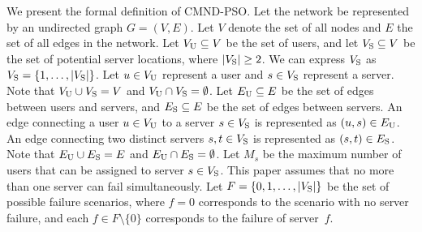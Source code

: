 \documentclass[10pt, letterpaper]{IEEEtran}
\begin{document}
\begin{CJK}{UTF8}{ipxm}
We present the formal definition of CMND-PSO. Let the network be represented by an undirected graph $G = (V, E)$.
Let $V$ denote the set of all nodes and $E$ the set of all edges in the network.
Let $V_{\rm{U}} \subseteq V$ be the set of users, and let $V_{\rm{S}} \subseteq V$ be the set of potential server locations, where $|V_{\rm{S}}| \geq 2$.
We can express $V_{\rm{S}}$ as $V_{\rm{S}} = \{1, \ldots, |V_{\rm{S}}|\}$.
Let $u \in V_{\rm{U}}$ represent a user and $s \in V_{\rm{S}}$ represent a server.
Note that $V_{\rm{U}} \cup V_{\rm{S}} = V$ and $V_{\rm{U}} \cap V_{\rm{S}} = \emptyset$.
Let $E_{\rm{U}} \subseteq E$ be the set of edges between users and servers, and $E_{\rm{S}} \subseteq E$ be the set of edges between servers.
An edge connecting a user $u \in V_{\rm{U}}$ to a server $s \in V_{\rm{S}}$ is represented as $(u,s) \in E_{\rm{U}}$.
An edge connecting two distinct servers $s, t \in V_{\rm{S}}$ is represented as $(s, t) \in E_{\rm{S}}$.
Note that $E_{\rm U} \cup E_{\rm S} =E$ and $E_{\rm{U}} \cap E_{\rm{S}} = \emptyset$.
Let $M_s$ be the maximum number of users that can be assigned to server $s \in V_{\rm{S}}$.
This paper assumes that no more than one server can fail simultaneously.
Let $F = \{0, 1, \ldots, |V_{\rm{S}}|\}$ be the set of possible failure scenarios, where $f = 0$ corresponds to the scenario with no server failure, and each $f \in F \setminus \{0\}$ corresponds to the failure of server~$f$.


\end{CJK}
\end{document}
